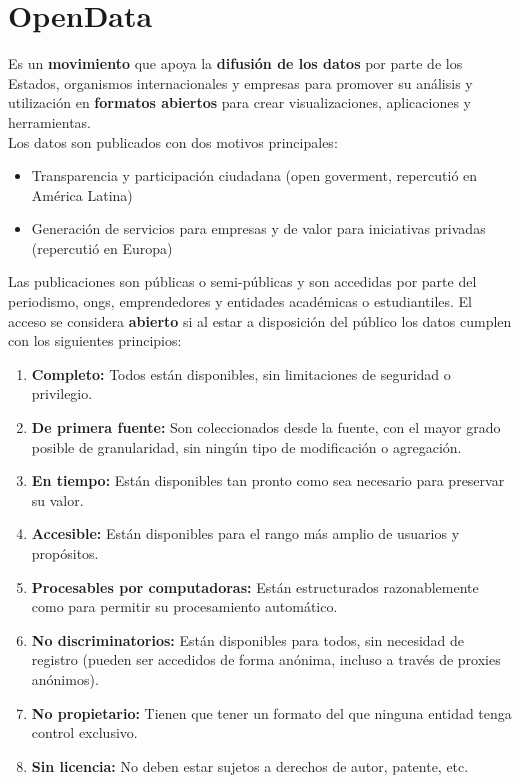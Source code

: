 \section*{OpenData}
Es un \textbf{movimiento} que apoya la \textbf{difusión de los datos} por parte de los Estados, organismos internacionales y empresas para promover su análisis y utilización en \textbf{formatos abiertos} para crear visualizaciones, aplicaciones y herramientas. \\
Los datos son publicados con dos motivos principales:
\begin{itemize}
    \item Transparencia y participación ciudadana (open goverment, repercutió en América Latina)
    \item Generación de servicios para empresas y de valor para iniciativas privadas (repercutió en Europa)
\end{itemize}
Las publicaciones son públicas o semi-públicas y son accedidas por parte del periodismo, ongs, emprendedores y entidades académicas o estudiantiles. El acceso se considera \textbf{abierto} si al estar a disposición del público los datos cumplen con los siguientes principios:
\begin{enumerate}[label=\roman*]
    \item \textbf{Completo:} Todos están disponibles, sin limitaciones de seguridad o privilegio.
    \item \textbf{De primera fuente:} Son coleccionados desde la fuente, con el mayor grado posible de granularidad, sin ningún tipo de modificación o agregación.
    \item \textbf{En tiempo:} Están disponibles tan pronto como sea necesario para preservar su valor.
    \item \textbf{Accesible:} Están disponibles para el rango más amplio de usuarios y propósitos.
    \item \textbf{Procesables por computadoras:} Están estructurados razonablemente como para permitir su procesamiento automático.
    \item \textbf{No discriminatorios:} Están disponibles para todos, sin necesidad de registro (pueden ser accedidos de forma anónima, incluso a través de proxies anónimos).
    \item \textbf{No propietario:} Tienen que tener un formato del que ninguna entidad tenga control exclusivo.
    \item \textbf{Sin licencia:} No deben estar sujetos a derechos de autor, patente, etc.
\end{enumerate}
